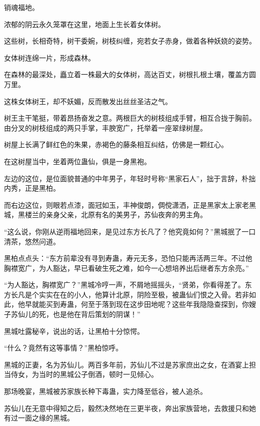 
\begin{this_body}



销魂福地。

浓郁的阴云永久笼罩在这里，地面上生长着女体树。

这些树，长相奇特，树干委婉，树枝纠缠，宛若女子赤身，做着各种妖娆的姿势。

女体树连绵一片，形成森林。

在森林的最深处，矗立着一株最大的女体树，高达百丈，树根扎根土壤，覆盖方圆万里。

这株女体树王，却不妖媚，反而散发出丝丝圣洁之气。

树王主干笔挺，带着昂扬奋发之意。两根巨大的树枝组成手臂，相互合拢于胸前。由分叉的树枝组成的两只手掌，丰腴宽广，托举着一座翠绿树屋。

树屋上长满了鲜红色的朱果，赤褐色的藤条相互纠结，仿佛是一颗红心。

在这树屋当中，坐着两位蛊仙，俱是一身黑袍。

左边的这位，是位面貌普通的中年男子，年轻时号称“黑家石人”，拙于言辞，朴拙内秀，正是黑柏。

而右边这位，则眼若点漆，面冠如玉，丰神俊朗，倜傥潇洒，正是黑家太上家老黑城，黑楼兰的亲身父亲，北原有名的美男子，苏仙夜奔的男主角。

“这么说，你刚从逆雨福地回来，是见过东方长凡了？他究竟如何？”黑城抿了一口清茶，悠然问道。

黑柏点点头：“东方前辈没有寻到寿蛊，寿元无多，恐怕只能再活两三年。不过他胸襟宽广，为人豁达，早已看破生死之难，如今一心想培养出后继者东方余亮。”

“为人豁达，胸襟宽广？”黑城冷哼一声，不屑地摇摇头，“贤弟，你看得差了。东方长凡是个实实在在的小人，他算计北原，阴险至极，被蛊仙们恨之入骨。若非如此，他早就能买到寿蛊，何至于落到现在这步田地呢？这些年我隐隐查探到，你嫂子苏仙儿的死，也是他在背后策划的阴谋！”

黑城吐露秘辛，说出的话，让黑柏十分惊愕。

“什么？竟然有这等事情？”黑柏惊呼。

黑城的正妻，名为苏仙儿。两百多年前，苏仙儿不过是苏家庶出之女，在酒宴上担当侍女，为当时的黑城公子倒酒，顿时一见倾心。

那场晚宴，黑城被苏家族长种下毒蛊，实力降至低谷，被人追杀。

苏仙儿在无意中得知之后，毅然决然地在三更半夜，奔出家族营地，去救援只和她有过一面之缘的黑城。


\end{this_body}
